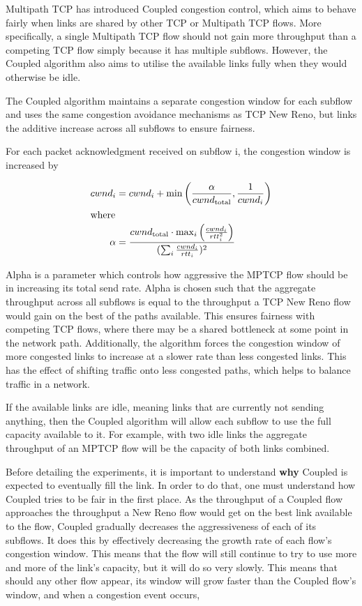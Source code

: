 Multipath TCP has introduced Coupled congestion control, which aims to behave 
fairly when links are shared by other TCP or Multipath TCP flows. More 
specifically, a single Multipath TCP flow should not gain more throughput than a 
competing TCP flow simply because it has multiple subflows. However, the Coupled 
algorithm also aims to utilise the available links fully when they would 
otherwise be idle.

The Coupled algorithm maintains a separate congestion window for each subflow
and uses the same congestion avoidance mechanisms as TCP New Reno, but links the
additive increase across all subflows to ensure fairness.

For each packet acknowledgment received on subflow i, the congestion window is
increased by

\begin{align*}
  cwnd_i &= cwnd_i +
    \min\left(\frac{\alpha}{cwnd_\text{total}}, \frac{1}{cwnd_i}\right) \\
  \intertext{where}
  \alpha &=
    \frac{cwnd_\text{total} \cdot \max_i\left(\frac{cwnd_i}{rtt_i^2}\right)}
         {(\sum_i \frac{cwnd_i}{rtt_i})^2}
\end{align*}

Alpha is a parameter which controls how aggressive the MPTCP flow should be in
increasing its total send rate. Alpha is chosen such that the aggregate
throughput across all subflows is equal to the throughput a TCP New Reno flow
would gain on the best of the paths available. This ensures fairness with
competing TCP flows, where there may be a shared bottleneck at some point in the
network path. Additionally, the algorithm forces the congestion window of more
congested links to increase at a slower rate than less congested links. This has
the effect of shifting traffic  onto less congested paths, which helps to
balance traffic in a network.

If the available links are idle, meaning links that are currently not sending 
anything, then the Coupled algorithm will allow each subflow to use the full 
capacity available to it. For example, with two idle links the aggregate 
throughput of an MPTCP flow will be the capacity of both links combined.


Before detailing the experiments, it is important to understand \textbf{why}
Coupled is expected to eventually fill the link. In order to do that, one must
understand how Coupled tries to be fair in the first place. As the throughput of
a Coupled flow approaches the throughput a New Reno flow would get on the best
link available to the flow, Coupled gradually decreases the aggressiveness of
each of its subflows. It does this by effectively decreasing the growth rate of
each flow's congestion window. This means that the flow will still continue to
try to use more and more of the link's capacity, but it will do so very slowly.
This means that should any other flow appear, its window will grow faster than
the Coupled flow's window, and when a congestion event occurs, %

